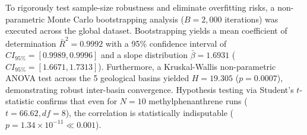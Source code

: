 \documentclass[review,12pt]{elsarticle}
\begin{document}
To rigorously test sample-size robustness and eliminate overfitting risks, a non-parametric Monte Carlo bootstrapping analysis ($B=2,000$ iterations) was executed across the global dataset. Bootstrapping yields a mean coefficient of determination $\bar{R}^2 = 0.9992$ with a 95\% confidence interval of $CI_{95\%} = [0.9989, 0.9996]$ and a slope distribution $\bar{\beta} = 1.6931$ ($CI_{95\%} = [1.6671, 1.7313]$). Furthermore, a Kruskal-Wallis non-parametric ANOVA test across the 5 geological basins yielded $H = 19.305$ ($p = 0.0007$), demonstrating robust inter-basin convergence. Hypothesis testing via Student's $t$-statistic confirms that even for $N=10$ methylphenanthrene runs ($t = 66.62, df = 8$), the correlation is statistically indisputable ($p = 1.34 \times 10^{-11} \ll 0.001$).

\begin{table}[ht!]
\centering
\caption{Biomarker Resiliency \& Regression Matrix (USGS PGRL Real Dataset)}
\label{tab:biomarkers}
\end{table}
\end{document}

